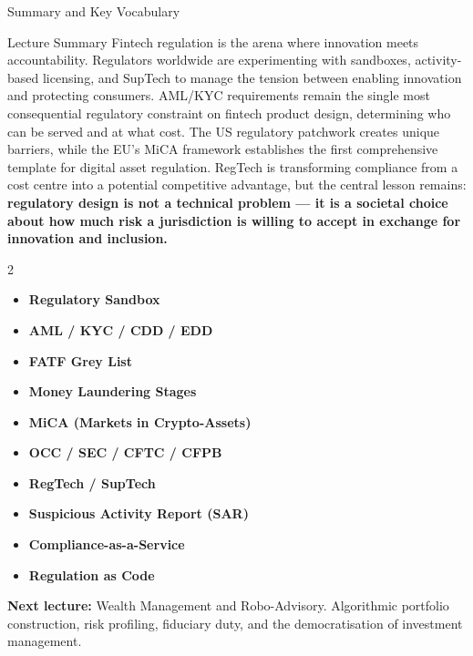 \begin{frame}{Summary and Key Vocabulary}
  \begin{block}{Lecture Summary}
    Fintech regulation is the arena where innovation meets accountability.
    Regulators worldwide are experimenting with sandboxes, activity-based
    licensing, and SupTech to manage the tension between enabling innovation
    and protecting consumers. AML/KYC requirements remain the single most
    consequential regulatory constraint on fintech product design, determining
    who can be served and at what cost. The US regulatory patchwork creates
    unique barriers, while the EU's MiCA framework establishes the first
    comprehensive template for digital asset regulation. RegTech is
    transforming compliance from a cost centre into a potential competitive
    advantage, but the central lesson remains:
    \textcolor{mlpurple}{\textbf{regulatory design is not a technical
    problem --- it is a societal choice about how much risk a jurisdiction
    is willing to accept in exchange for innovation and inclusion.}}
  \end{block}
  \vspace{0.4em}
  \begin{multicols}{2}
    \small
    \begin{itemize}
      \item \textbf{Regulatory Sandbox}
      \item \textbf{AML / KYC / CDD / EDD}
      \item \textbf{FATF Grey List}
      \item \textbf{Money Laundering Stages}
      \item \textbf{MiCA (Markets in Crypto-Assets)}
      \item \textbf{OCC / SEC / CFTC / CFPB}
      \item \textbf{RegTech / SupTech}
      \item \textbf{Suspicious Activity Report (SAR)}
      \item \textbf{Compliance-as-a-Service}
      \item \textbf{Regulation as Code}
    \end{itemize}
  \end{multicols}
  \vspace{0.2em}
  \textcolor{mlgray}{\small \textbf{Next lecture:} Wealth Management and Robo-Advisory.
  Algorithmic portfolio construction, risk profiling, fiduciary duty, and the
  democratisation of investment management.}
\end{frame}


